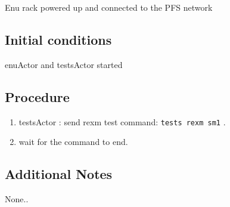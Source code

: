 Enu rack powered up and connected to the PFS network

\subsection{Initial conditions}
enuActor and testsActor started

\subsection{Procedure}

\begin{enumerate}
    \item testsActor : send rexm test command: \texttt{tests rexm sm1} .
    \item wait for the command to end.
\end{enumerate}



\subsection{Additional Notes}

None..
